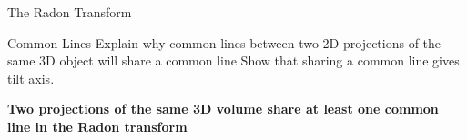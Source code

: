 \documentclass[t, 11pt]{beamer}
\begin{document}
\begin{frame}[fragile]{The Radon Transform}
{\begin{center}
    \end{center}}

\end{frame}

\begin{frame}[fragile]{Common Lines}
  Explain why common lines between two 2D projections of the same 3D object will share a common line
  Show that sharing a common line gives tilt axis.

  \textbf{Two projections of the same 3D volume share at least one common line in the Radon transform}
\end{frame}
\end{document}
